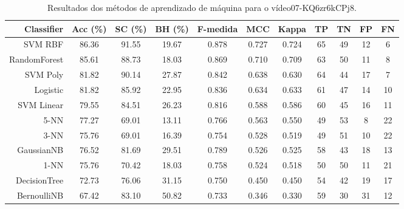 \begin{table}[!htb]
\centering
\caption{Resultados dos métodos de aprendizado de máquina para o vídeo07-KQ6zr6kCPj8.}
\label{tab:07-KQ6zr6kCPj8}
\begin{tabular}{r|c|c|c|c|c|c|c|c|c|c}
\hline\hline
Classifier & Acc (\%) & SC (\%) & BH (\%) & F-medida & MCC & Kappa & TP & TN & FP & FN \\ \hline
SVM RBF & 86.36 & 91.55 & 19.67 & 0.878 & 0.727 & 0.724 & 65 & 49 & 12 & 6 \\ 
RandomForest & 85.61 & 88.73 & 18.03 & 0.869 & 0.710 & 0.709 & 63 & 50 & 11 & 8 \\ 
SVM Poly & 81.82 & 90.14 & 27.87 & 0.842 & 0.638 & 0.630 & 64 & 44 & 17 & 7 \\ 
Logistic & 81.82 & 85.92 & 22.95 & 0.836 & 0.634 & 0.633 & 61 & 47 & 14 & 10 \\ 
SVM Linear & 79.55 & 84.51 & 26.23 & 0.816 & 0.588 & 0.586 & 60 & 45 & 16 & 11 \\ 
5-NN & 77.27 & 69.01 & 13.11 & 0.766 & 0.563 & 0.550 & 49 & 53 & 8 & 22 \\ 
3-NN & 75.76 & 69.01 & 16.39 & 0.754 & 0.528 & 0.519 & 49 & 51 & 10 & 22 \\ 
GaussianNB & 76.52 & 81.69 & 29.51 & 0.789 & 0.526 & 0.525 & 58 & 43 & 18 & 13 \\ 
1-NN & 75.76 & 70.42 & 18.03 & 0.758 & 0.524 & 0.518 & 50 & 50 & 11 & 21 \\ 
DecisionTree & 72.73 & 76.06 & 31.15 & 0.750 & 0.450 & 0.450 & 54 & 42 & 19 & 17 \\ 
BernoulliNB & 67.42 & 83.10 & 50.82 & 0.733 & 0.346 & 0.330 & 59 & 30 & 31 & 12 \\ 
\hline\hline
\end{tabular}
\end{table}
